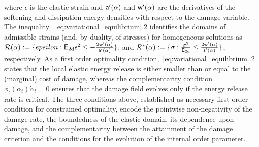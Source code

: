 where $\epsilon$ is the elastic strain and $\mathsf{a}'(\alpha)$ and $\mathsf{w}'(\alpha)$ are the derivatives of the softening and dissipation energy densities with respect to the damage variable.
The inequality ~\eqref{eq:variational_equilibrium}.2 identifies the domains of admissible strains (and, by duality, of stresses) for homogeneous solutions as
$\mathcal{R}(\alpha):=\{epsilon: \mathsf{E_{\text{2d}}} \epsilon^2 \leq -\frac{2 \mathsf{w}'(\alpha)}{\mathsf{a}'(\alpha)}\},$ and $
\mathcal{R}^*(\alpha):=\{\sigma: \frac{\sigma^2}{\mathsf{E_{\text{2d}}}} \leq \frac{2 \mathsf{w}'(\alpha)}{\mathsf{s}'(\alpha)}\}$, respectively.
% 
As a first order optimality condition,~\eqref{eq:variational_equilibrium}.2 states that the local elastic energy release is either smaller than or equal to the (marginal) cost of damage, whereas the complementarity condition $\phi_t(\alpha_t)\dot \alpha_t = 0$ ensures that the damage field evolves only if the energy release rate is critical.
The three conditions above, established as necessary first order condition for constrained optimality, encode the pointwise non-negativity of the damage rate, the boundedness of the elastic domain, its dependence upon damage, and the complementarity between the attainment of the damage criterion and the conditions for the evolution of the internal order parameter. 

